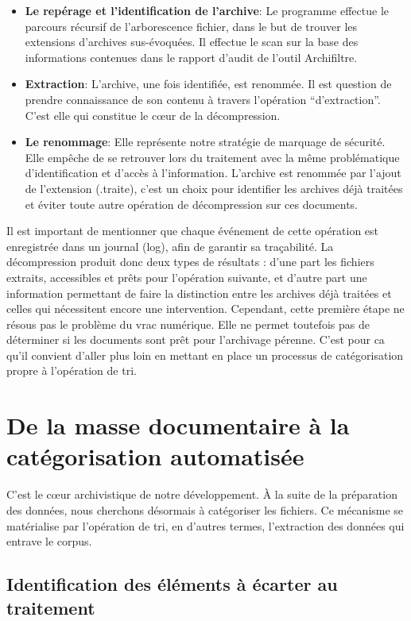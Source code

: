 \begin{itemize}[label=---]
	\item \textbf{Le repérage et l'identification de l'archive}: Le programme effectue le parcours récursif de l'arborescence fichier, dans le but de trouver les extensions d'archives sus-évoquées. Il effectue le scan sur la base des informations contenues dans le rapport d'audit de l'outil Archifiltre.
	\item \textbf{Extraction}: L'archive, une fois identifiée, est renommée. Il est question de prendre connaissance de son contenu à travers l'opération \enquote{d'extraction}. C'est elle qui constitue le cœur de la décompression. 
	\item \textbf{Le renommage}: Elle représente notre stratégie de marquage de sécurité. Elle empêche de se retrouver lors du traitement avec la même problématique d'identification et d'accès à l'information. L'archive est renommée par l'ajout de l'extension (.traite), c'est un choix pour identifier les archives déjà traitées et éviter toute autre opération de décompression sur ces documents.	
\end{itemize}

Il est important de mentionner que chaque événement de cette opération est enregistrée dans un journal (log), afin de garantir sa traçabilité.
La décompression produit donc deux types de résultats : d'une part les fichiers extraits, accessibles et prêts pour l'opération suivante, et d'autre part une information permettant de faire la distinction entre les archives déjà traitées et celles qui nécessitent encore une intervention. Cependant, cette première étape ne résous pas le problème du vrac numérique. Elle ne permet toutefois pas de déterminer si les documents sont prêt pour l'archivage pérenne. C'est pour ca qu'il convient d'aller plus loin en mettant en place un processus de catégorisation propre à l'opération de tri.


\section{De la masse documentaire à la catégorisation automatisée}

C’est le cœur archivistique de notre développement. À la suite de la préparation des données, nous cherchons désormais à catégoriser les fichiers. Ce mécanisme se matérialise par l'opération de tri, en d'autres termes, l'extraction des données qui entrave le corpus.

\subsection*{Identification des éléments à écarter au traitement}

